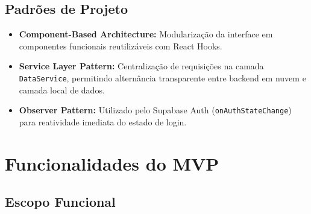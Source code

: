 \documentclass[12pt, a4paper]{article}
\begin{document}
\subsection{Padr\~{o}es de Projeto}

\begin{itemize}[leftmargin=2cm]
  \item \textbf{Component-Based Architecture:} Modulariza\c{c}\~{a}o da interface em componentes funcionais reutiliz\'{a}veis com React Hooks.
  \item \textbf{Service Layer Pattern:} Centraliza\c{c}\~{a}o de requisi\c{c}\~{o}es na camada \texttt{DataService}, permitindo altern\^{a}ncia transparente entre backend em nuvem e camada local de dados.
  \item \textbf{Observer Pattern:} Utilizado pelo Supabase Auth (\texttt{onAuthStateChange}) para reatividade imediata do estado de login.
\end{itemize}

\section{Funcionalidades do MVP}

\subsection{Escopo Funcional}
\end{document}
